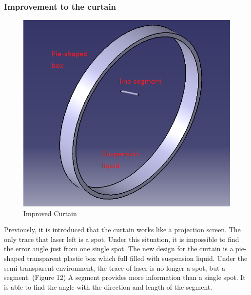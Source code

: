 \documentclass[12pt]{article}
\begin{document}
\begin{flushleft}
\subsubsection{Improvement to the curtain}
\begin{figure}[ht!]
	\begin{center}
		\includegraphics[scale = 0.8]{improvedcurtain.png}
		\caption{Improved Curtain}
	\end{center}
\end{figure}
Previously, it is introduced that the curtain works like a projection screen. The only trace that laser left is a spot. Under this situation, it is impossible to find the error angle just from one single spot. The new design for the curtain is a pie-shaped transparent plastic box which full filled with suspension liquid. Under the semi transparent environment, the trace of laser is no longer a spot, but a segment. (Figure 12) A segment provides more information than a single spot. It is able to find the angle with the direction and length of the segment.


\end{flushleft}
\end{document}
